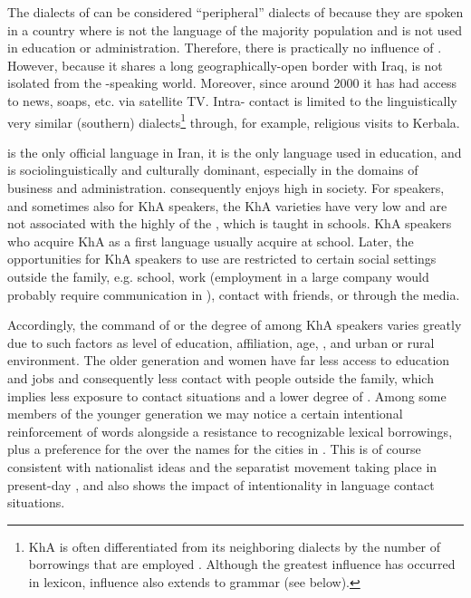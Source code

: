 \documentclass[output=paper,nonflat]{langsci/langscibook}
\begin{document}
The dialects of  can be considered “peripheral” dialects of  because they are spoken in a country where  is not the language of the majority population and is not used in education or administration. Therefore, there is practically no influence of  . However, because it shares a long geographically-open border with Iraq,  is not isolated from the -speaking world. Moreover, since around 2000 it has had access to  news, soaps, etc. via satellite TV. Intra- contact is limited to the linguistically very similar (southern)  dialects\footnote{KhA is often differentiated from its neighboring  dialects by the number of  borrowings that are employed \citep[1020]{Gazsi2011}. Although the greatest influence has occurred in lexicon,  influence also extends to grammar (see below).} through, for example, religious visits to Kerbala.

 is the only official language in Iran, it is the only language used in education, and is sociolinguistically and culturally dominant, especially in the domains of business and administration.  consequently enjoys high  in society. For  speakers, and sometimes also for KhA speakers, the KhA varieties have very low  and are not associated with the highly   of the , which is taught in schools. KhA speakers who acquire KhA as a first language usually acquire  at school. Later, the opportunities for KhA speakers to use  are restricted to certain social settings outside the family, e.g. school, work (employment in a large company would probably require communication in ), contact with  friends, or through the  media.

Accordingly, the command of  or the degree of  among KhA speakers varies greatly due to such factors as level of education, affiliation, age, , and urban or rural environment. The older generation and women have far less access to education and jobs and consequently less contact with people outside the family, which implies less exposure to contact situations and a lower degree of . Among some members of the younger generation we may notice a certain intentional reinforcement of  words alongside a resistance to recognizable  lexical borrowings, plus a preference for the  over the  names for the cities in . This is of course consistent with nationalist ideas and the separatist movement taking place in present-day , and also shows the impact of intentionality in language contact situations. 
\end{document}

